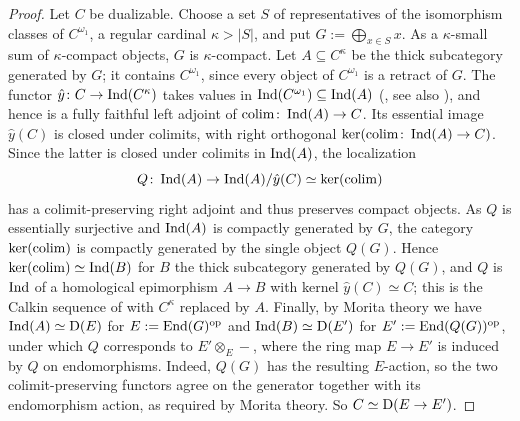 	\begin{proof}
		Let $C$ be dualizable. Choose a set $S$ of representatives of the isomorphism classes of $C^{\omega_1}$, a regular cardinal $\kappa > |S|$, and put $G := \bigoplus_{x \in S} x$. As a $\kappa$-small sum of $\kappa$-compact objects, $G$ is $\kappa$-compact. Let $A \subseteq C^{\kappa}$ be the thick subcategory generated by $G$; it contains $C^{\omega_1}$, since every object of $C^{\omega_1}$ is a retract of $G$. The functor $\hat{y}\colon C \to \operatorname{Ind}(C^{\kappa})$ takes values in $\operatorname{Ind}(C^{\omega_1}) \subseteq \operatorname{Ind}(A)$ (, see also \cite[Corollary~2.14]{Efimov_Large_Categories}), and hence is a fully faithful left adjoint of $\operatorname{colim}\colon \operatorname{Ind}(A) \to C$. Its essential image $\hat{y}(C)$ is closed under colimits, with right orthogonal $\ker(\operatorname{colim}\colon \operatorname{Ind}(A) \to C)$. Since the latter is closed under colimits in $\operatorname{Ind}(A)$, the localization
		\[
			Q\colon \operatorname{Ind}(A) \to \operatorname{Ind}(A)/\hat{y}(C) \simeq \ker(\operatorname{colim})
		\]
		has a colimit-preserving right adjoint and thus preserves compact objects. As $Q$ is essentially surjective and $\operatorname{Ind}(A)$ is compactly generated by $G$, the category $\ker(\operatorname{colim})$ is compactly generated by the single object $Q(G)$. Hence $\ker(\operatorname{colim}) \simeq \operatorname{Ind}(B)$ for $B$ the thick subcategory generated by $Q(G)$, and $Q$ is $\operatorname{Ind}$ of a homological epimorphism $A \to B$ with kernel $\hat{y}(C) \simeq C$; this is the Calkin sequence of  with $C^{\kappa}$ replaced by $A$. Finally, by Morita theory \cite[Theorem~7.1.2.1]{lurie2016HA} we have $\operatorname{Ind}(A) \simeq \operatorname{\mathrm{D}}(E)$ for $E := \operatorname{End}(G)^{\textup{op}}$ and $\operatorname{Ind}(B) \simeq \operatorname{\mathrm{D}}(E')$ for $E' := \operatorname{End}(Q(G))^{\textup{op}}$, under which $Q$ corresponds to $E' \otimes_E -$, where the ring map $E \to E'$ is induced by $Q$ on endomorphisms. Indeed, $Q(G)$ has the resulting $E$-action, so the two colimit-preserving functors agree on the generator together with its endomorphism action, as required by Morita theory. So $C \simeq \operatorname{\mathrm{D}}(E \to E')$.
	\end{proof}

